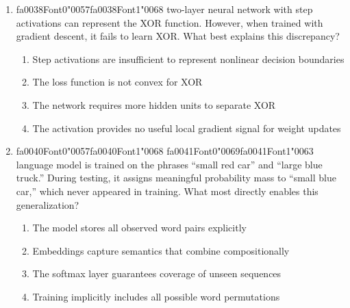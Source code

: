\documentclass[12pt]{article}
\begin{document}
\begin{enumerate}[label=Q\arabic*.]
 \begin{enumerate}[label=(\Alph*)]
     \item It removes independence assumptions
     \item It restricts conditioning context
     \item It increases vocabulary size
     \item It enforces smoothing
 \end{enumerate}
 
 \item {\csname fa0038Font0\endcsname\char"0057}{\csname fa0038Font1\endcsname\char"0068} two-layer neural network with step activations can represent the XOR function. However, when trained with gradient descent, it fails to learn XOR. What best explains this discrepancy?
 \begin{enumerate}[label=(\Alph*)]
     \item Step activations are insufficient to represent nonlinear decision boundaries
     \item The loss function is not convex for XOR
     \item The network requires more hidden units to separate XOR
     \item The activation provides no useful local gradient signal for weight updates
 \end{enumerate}
 
 \item {\csname fa0040Font0\endcsname\char"0057}{\csname fa0040Font1\endcsname\char"0068} {\csname fa0041Font0\endcsname\char"0069}{\csname fa0041Font1\endcsname\char"0063} language model is trained on the phrases ``small red car'' and ``large blue truck.'' During testing, it assigns meaningful probability mass to ``small blue car,'' which never appeared in training. What most directly enables this generalization?
 \begin{enumerate}[label=(\Alph*)]
     \item The model stores all observed word pairs explicitly
     \item Embeddings capture semantics that combine compositionally
     \item The softmax layer guarantees coverage of unseen sequences
     \item Training implicitly includes all possible word permutations
 \end{enumerate}
 

\end{enumerate}
\end{document}
